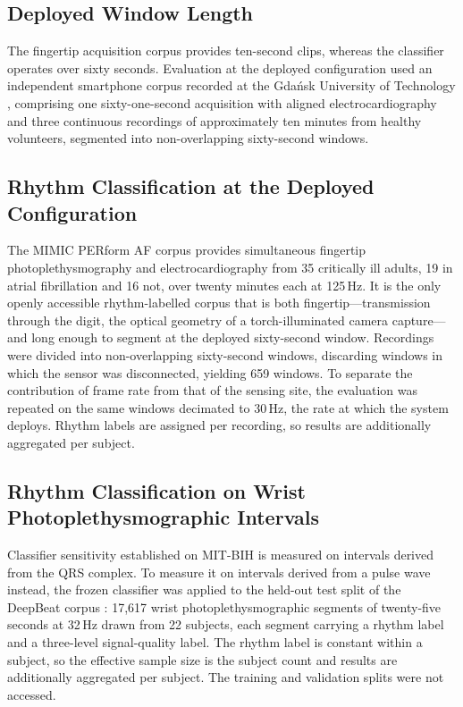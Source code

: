 \documentclass[conference]{IEEEtran}
\begin{document}
\subsection{Deployed Window Length}
The fingertip acquisition corpus provides ten-second clips, whereas the classifier
operates over sixty seconds. Evaluation at the deployed configuration used an
independent smartphone corpus recorded at the Gda\'{n}sk University of Technology
\cite{bancerewicz2025}, comprising one sixty-one-second acquisition with aligned
electrocardiography and three continuous recordings of approximately ten minutes from
healthy volunteers, segmented into non-overlapping sixty-second windows.

\subsection{Rhythm Classification at the Deployed Configuration}
\label{sec:mimicmethod}
The MIMIC PERform AF corpus \cite{charlton2022} provides simultaneous fingertip
photoplethysmography and electrocardiography from 35 critically ill adults, 19 in atrial
fibrillation and 16 not, over twenty minutes each at 125\,Hz. It is the only openly
accessible rhythm-labelled corpus that is both fingertip---transmission through the
digit, the optical geometry of a torch-illuminated camera capture---and long enough to
segment at the deployed sixty-second window. Recordings were divided into
non-overlapping sixty-second windows, discarding windows in which the sensor was
disconnected, yielding 659 windows. To separate the contribution of frame rate from that
of the sensing site, the evaluation was repeated on the same windows decimated to
30\,Hz, the rate at which the system deploys. Rhythm labels are assigned per recording,
so results are additionally aggregated per subject.

\subsection{Rhythm Classification on Wrist Photoplethysmographic Intervals}
Classifier sensitivity established on MIT-BIH is measured on intervals derived from the
QRS complex. To measure it on intervals derived from a pulse wave instead, the frozen
classifier was applied to the held-out test split of the DeepBeat corpus
\cite{torressoto2020}: 17{,}617 wrist photoplethysmographic segments of twenty-five
seconds at 32\,Hz drawn from 22 subjects, each segment carrying a rhythm label and a
three-level signal-quality label. The rhythm label is constant within a subject, so the
effective sample size is the subject count and results are additionally aggregated per
subject. The training and validation splits were not accessed.
\end{document}
